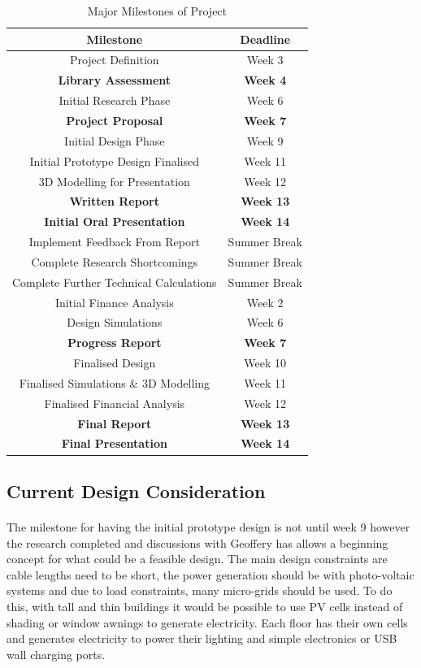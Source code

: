 \begin{table}[h!]
\centering
\begin{tabular}{||c c||} 
 \hline
 \textbf{Milestone} & \textbf{Deadline} \\ [0.5ex] 
 \hline\hline
 Project Definition & Week 3 \\ 
 \textbf{Library Assessment} & \textbf{Week 4} \\
 Initial Research Phase & Week 6 \\
 \textbf{Project Proposal} & \textbf{Week 7} \\
 Initial Design Phase & Week 9 \\
 Initial Prototype Design Finalised & Week 11 \\
 3D Modelling for Presentation & Week 12 \\ 
 \textbf{Written Report} & \textbf{Week 13} \\ 
 \textbf{Initial Oral Presentation} & \textbf{Week 14} \\
 Implement Feedback From Report & Summer Break \\
 Complete Research Shortcomings & Summer Break \\
 Complete Further Technical Calculations & Summer Break \\
 Initial Finance Analysis & Week 2 \\
 Design Simulations & Week 6 \\
 \textbf{Progress Report} & \textbf{Week 7} \\
 Finalised Design & Week 10 \\
 Finalised Simulations \& 3D Modelling & Week 11 \\
 Finalised Financial Analysis & Week 12 \\
 \textbf{Final Report} & \textbf{Week 13} \\ 
 \textbf{Final Presentation} & \textbf{Week 14} \\ [1ex] 
 \hline
\end{tabular}
\caption{Major Milestones of Project}
\label{table:1}
\end{table}  

\newpage
\subsection{Current Design Consideration}

\paragraph{}
The milestone for having the initial prototype design is not until week 9 however the research completed and discussions with Geoffery has allows a beginning concept for what could be a feasible design. The main design constraints are cable lengths need to be short, the power generation should be with photo-voltaic systems and due to load constraints, many micro-grids should be used. To do this, with tall and thin buildings it would be possible to use PV cells instead of shading or window awnings to generate electricity. Each floor has their own cells and generates electricity to power their lighting and simple electronics or USB wall charging ports. 

